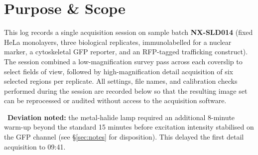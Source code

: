 
\begin{minipage}[t]{0.32\linewidth}
\begin{tcolorbox}[infobox,title=\faCalendar\ Session]
\end{tcolorbox}
\end{minipage}\hfill
\begin{minipage}[t]{0.32\linewidth}
\begin{tcolorbox}[infobox,title=\faFlask\ Sample]
\end{tcolorbox}
\end{minipage}\hfill
\begin{minipage}[t]{0.32\linewidth}
\begin{tcolorbox}[infobox,title=\faMicroscope\ Instrument]
\end{tcolorbox}
\end{minipage}
\par

\vspace{0.9em}

\section*{Purpose \& Scope}

This log records a single acquisition session on sample batch \textbf{NX-SLD014} (fixed
HeLa monolayers, three biological replicates, immunolabelled for a nuclear marker,
a cytoskeletal GFP reporter, and an RFP-tagged trafficking construct). The session
combined a low-magnification survey pass across each coverslip to select fields of
view, followed by high-magnification detail acquisition of six selected regions per
replicate. All settings, file names, and calibration checks performed during the
session are recorded below so that the resulting image set can be reprocessed or
audited without access to the acquisition software.

\begin{tcolorbox}[flagbox]
\faExclamationTriangle\ \textbf{Deviation noted:} the metal-halide lamp required an
additional 8-minute warm-up beyond the standard 15 minutes before excitation
intensity stabilised on the GFP channel (see \S\ref{sec:notes} for disposition).
This delayed the first detail acquisition to 09:41.
\end{tcolorbox}
